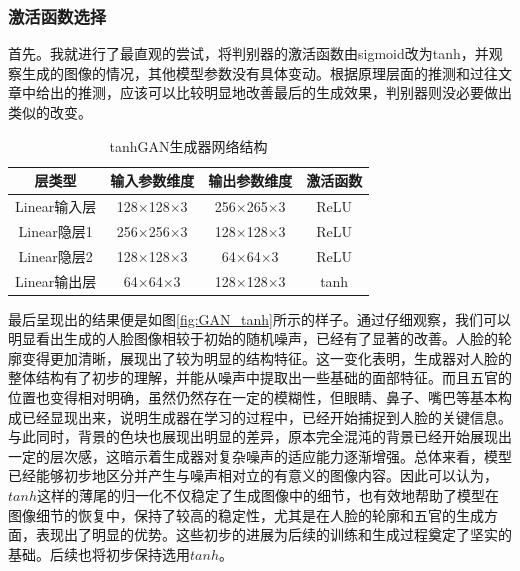 \documentclass[UTF8]{ctexart}
\begin{document}
\subsubsection{激活函数选择}
首先。我就进行了最直观的尝试，将判别器的激活函数由sigmoid改为tanh，并观察生成的图像的情况，其他模型参数没有具体变动。根据原理层面的推测和过往文章中给出的推测，应该可以比较明显地改善最后的生成效果，判别器则没必要做出类似的改变。\par
\begin{table}[htbp]
\centering
\caption{tanhGAN生成器网络结构}
\label{tab:gen_tanhgan}
\begin{tabular}{cccc}
\toprule[1.5pt]
\textbf{层类型} & \textbf{输入参数维度} & \textbf{输出参数维度} & \textbf{激活函数} \\
\midrule[1.5pt]
Linear输入层 & 128$\times$128$\times$3 & 256$\times$265$\times$3 & ReLU \\
Linear隐层1 & 256$\times$256$\times$3 & 128$\times$128$\times$3 & ReLU \\
Linear隐层2 & 128$\times$128$\times$3 & 64$\times$64$\times$3 & ReLU \\
Linear输出层 & 64$\times$64$\times$3 & 128$\times$128$\times$3 & tanh \\
\bottomrule[1.0pt]
\end{tabular}
\end{table}
最后呈现出的结果便是如图\ref{fig:GAN_tanh}所示的样子。通过仔细观察，我们可以明显看出生成的人脸图像相较于初始的随机噪声，已经有了显著的改善。人脸的轮廓变得更加清晰，展现出了较为明显的结构特征。这一变化表明，生成器对人脸的整体结构有了初步的理解，并能从噪声中提取出一些基础的面部特征。而且五官的位置也变得相对明确，虽然仍然存在一定的模糊性，但眼睛、鼻子、嘴巴等基本构成已经显现出来，说明生成器在学习的过程中，已经开始捕捉到人脸的关键信息。与此同时，背景的色块也展现出明显的差异，原本完全混沌的背景已经开始展现出一定的层次感，这暗示着生成器对复杂噪声的适应能力逐渐增强。总体来看，模型已经能够初步地区分并产生与噪声相对立的有意义的图像内容。因此可以认为，$tanh$这样的薄尾的归一化不仅稳定了生成图像中的细节，也有效地帮助了模型在图像细节的恢复中，保持了较高的稳定性，尤其是在人脸的轮廓和五官的生成方面，表现出了明显的优势。这些初步的进展为后续的训练和生成过程奠定了坚实的基础。后续也将初步保持选用$tanh$。
\end{document}
